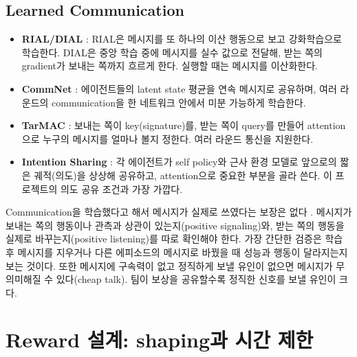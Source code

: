 \documentclass[11pt,a4paper]{article}
\begin{document}
\subsection{Learned Communication}
\begin{itemize}
 \item \textbf{RIAL/DIAL} \cite{dial}: RIAL은 메시지를 또 하나의 이산 행동으로 보고 강화학습으로 학습한다. DIAL은 중앙 학습 중에 메시지를 실수 값으로 전달해, 받는 쪽의 gradient가 보내는 쪽까지 흐르게 한다. 실행할 때는 메시지를 이산화한다.
 \item \textbf{CommNet} \cite{commnet}: 에이전트들의 latent state 평균을 연속 메시지로 공유하며, 여러 라운드의 communication을 한 네트워크 안에서 미분 가능하게 학습한다.
 \item \textbf{TarMAC} \cite{tarmac}: 보내는 쪽이 key(signature)를, 받는 쪽이 query를 만들어 attention으로 누구의 메시지를 얼마나 볼지 정한다. 여러 라운드 통신을 지원한다.
 \item \textbf{Intention Sharing} \cite{intention}: 각 에이전트가 self policy와 근사 환경 모델로 앞으로의 짧은 궤적(의도)을 상상해 공유하고, attention으로 중요한 부분을 골라 쓴다. 이 프로젝트의 의도 공유 조건과 가장 가깝다.
\end{itemize}
Communication을 학습했다고 해서 메시지가 실제로 쓰였다는 보장은 없다 \cite{lowe2019}. 메시지가 보내는 쪽의 행동이나 관측과 상관이 있는지(positive signaling)와, 받는 쪽의 행동을 실제로 바꾸는지(positive listening)를 따로 확인해야 한다. 가장 간단한 검증은 학습 후 메시지를 지우거나 다른 에피소드의 메시지로 바꿨을 때 성능과 행동이 달라지는지 보는 것이다. 또한 메시지에 구속력이 없고 정직하게 보낼 유인이 없으면 메시지가 무의미해질 수 있다(cheap talk). 팀이 보상을 공유할수록 정직한 신호를 보낼 유인이 크다.

\section{Reward 설계: shaping과 시간 제한}\label{sec:reward}
\end{document}
